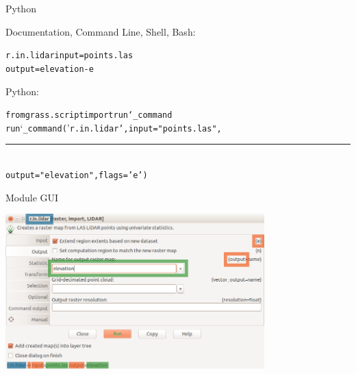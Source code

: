 \documentclass[xcolor={dvipsnames,usenames},beamer,aspectratio=169]{beamer}
\begin{document}
\begin{frame}{Python}


\Large

Documentation, Command Line, Shell, Bash:

\LARGE

\begin{alltt}
\textcolor{mod}{r.in.lidar} \textcolor{opt}{input}=\textcolor{txt}{points.las}
  \textcolor{opt}{output}=\textcolor{txt}{elevation} -\textcolor{flg}{e}
\end{alltt}

\bigskip

\Large

Python:


\LARGE

\begin{alltt}
\textcolor{import}{from grass.script import run\char`_command}
\\
run\char`_command('\textcolor{mod}{r.in.lidar}', \textcolor{opt}{input}="\textcolor{txt}{points.las}",

\newlength{\pyindent}
\settowidth{\pyindent}{run\_command(}
\rule{\pyindent}{0pt}\,%
\textcolor{opt}{output}="\textcolor{txt}{elevation}", flags='\textcolor{flg}{e}')
\end{alltt}

\end{frame}

\begin{frame}{Module GUI}

\begin{center}
  \includegraphics[width=0.75\textwidth]{grass/r_in_lidar_dialog}
\end{center}

\end{frame}
\end{document}
